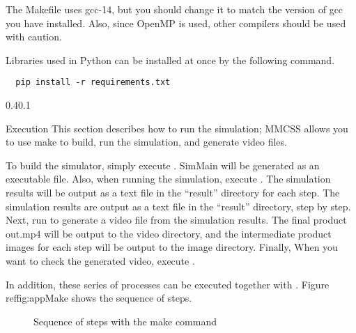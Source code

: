 \documentclass[vipdfmx,a4paper,11pt]{jsarticle}
\makeatletter
\renewcommand{\section}{%
  \@startsection{section}{1}{\z@}%
  {0.4\Cvs}{0.1\Cvs}%
  {\normalfont\large\headfont\raggedright}}
\makeatother
\begin{document}
The Makefile uses gcc-14, but you should change it to match the version of gcc you have installed.
Also, since OpenMP is used, other compilers should be used with caution.

Libraries used in Python can be installed at once by the following command.

\begin{lstlisting}
  pip install -r requirements.txt
\end{lstlisting}

\section{Execution}
This section describes how to run the simulation; MMCSS allows you to use make to build, run the simulation, and generate video files.

To build the simulator, simply execute . SimMain will be generated as an executable file.
Also, when running the simulation, execute . The simulation results will be output as a text file in the “result” directory for each step.
The simulation results are output as a text file in the “result” directory, step by step. Next, run  to generate a video file from the simulation results.
The final product out.mp4 will be output to the video directory, and the intermediate product images for each step will be output to the image directory. Finally,
When you want to check the generated video, execute .


In addition, these series of processes can be executed together with . Figure ref{fig:appMake} shows the sequence of steps.

\begin{figure}[tbp]
  \centering
  \caption{Sequence of steps with the make command}
  \label{fig:appMake}
\end{figure}
\end{document}
